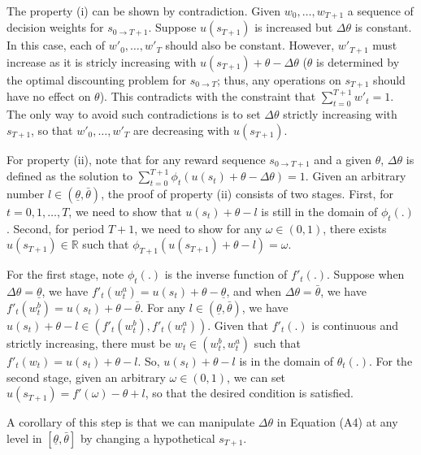 The property (i) can be shown by contradiction. Given \(w_0,…,w_{T+1}\)
a sequence of decision weights for \(s_{0\rightarrow T+1}\). Suppose
\(u(s_{T+1})\) is increased but \(\Delta \theta\) is constant. In this
case, each of \(w'_0,…,w'_T\) should also be constant. However,
\(w'_{T+1}\) must increase as it is stricly increasing with
\(u(s_{T+1})+\theta-\Delta \theta\) (\(\theta\) is determined by the
optimal discounting problem for \(s_{0\rightarrow T}\); thus, any
operations on \(s_{T+1}\) should have no effect on \(\theta\)). This
contradicts with the constraint that \(\sum_{t=0}^{T+1} w'_t =1\). The
only way to avoid such contradictions is to set \(\Delta \theta\)
strictly increasing with \(s_{T+1}\), so that \(w'_0,…,w'_T\) are
decreasing with \(u(s_{T+1})\).

For property (ii), note that for any reward sequence
\(s_{0\rightarrow T+1}\) and a given \(\theta\), \(\Delta\theta\) is
defined as the solution to
\(\sum_{t=0}^{T+1} \phi_t(u(s_t)+\theta-\Delta\theta)=1\). Given an
arbitrary number \(l\in(\underline{\theta},\bar{\theta})\), the proof of
property (ii) consists of two stages. First, for \(t=0,1,…,T\), we need
to show that \(u(s_t)+\theta-l\) is still in the domain of
\(\phi_t(.)\). Second, for period \(T+1\), we need to show for any
\(\omega\in(0,1)\), there exists \(u(s_{T+1})\in \mathbb{R}\) such that
\(\phi_{T+1}(u(s_{T+1})+\theta-l)=\omega\).

For the first stage, note \(\phi_t(.)\) is the inverse function of
\(f'_t(.)\). Suppose when \(\Delta\theta=\underline{\theta}\), we have
\(f'_t(w^{a}_t)=u(s_t)+\theta-\underline{\theta}\), and when
\(\Delta\theta=\bar{\theta}\), we have
\(f'_t(w^{b}_t)=u(s_t)+\theta-\bar{\theta}\). For any
\(l\in(\underline{\theta},\bar{\theta})\), we have
\(u(s_t)+\theta-l \in (f'_t(w^b_t),f'_t(w^a_t))\). Given that
\(f'_t(.)\) is continuous and strictly increasing, there must be
\(w_t\in(w^b_t,w^a_t)\) such that \(f'_t(w_t)=u(s_t)+\theta-l\). So,
\(u(s_t)+\theta-l\) is in the domain of \(\theta_t(.)\). For the second
stage, given an arbitrary \(\omega\in(0,1)\), we can set
\(u(s_{T+1})=f'(\omega)-\theta+l\), so that the desired condition is
satisfied.

A corollary of this step is that we can manipulate \(\Delta \theta\) in
Equation (A4) at any level in \([\underline{\theta},\bar{\theta}]\) by
changing a hypothetical \(s_{T+1}\).

